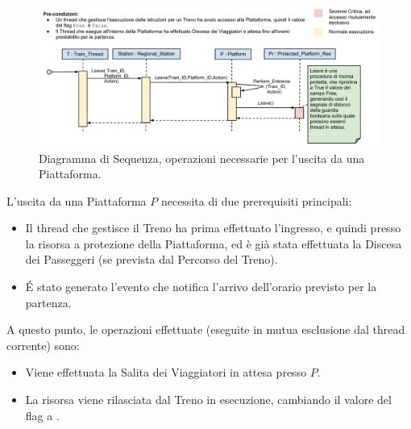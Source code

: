 \begin{description}
		\begin{figure}[htbp]
			\includegraphics[trim = 30mm 0mm 0mm 0mm,scale=0.5]{imgs/platform_exit_Sequence_Diagram.pdf}
			\caption{\footnotesize{Diagramma di Sequenza, operazioni necessarie per l'uscita da una Piattaforma.}}
			\label{fig:platform_access}
		\end{figure}
		
		L'uscita da una Piattaforma $P$ necessita di due prerequisiti principali:
		
			\begin{itemize}
				\item Il thread che gestisce il Treno ha prima effettuato l'ingresso, e quindi  presso la risorsa a protezione della Piattaforma, ed è già stata effettuata la Discesa dei Passeggeri (se prevista dal Percorso del Treno).
				\item \'E stato generato l'evento che notifica l'arrivo dell'orario previsto per la partenza.
			\end{itemize}
		
		A questo punto, le operazioni effettuate (eseguite in mutua esclusione dal thread corrente) sono:
		
			\begin{itemize}
				\item Viene effettuata la Salita dei Viaggiatori in attesa presso $P$.
				\item La risorsa viene rilasciata dal Treno in esecuzione, cambiando il valore del flag  a .
			\end{itemize}
		

\end{description}
